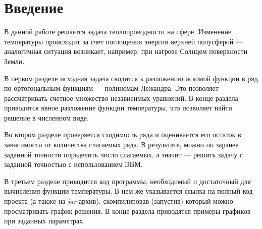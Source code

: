 \section*{Введение}
{}
\label{sec:intro}

В данной работе решается задача теплопроводности на сфере. Изменение температуры происходит за счет поглощения энергии верхней полусферой --- аналогичная ситуация возникает, например, при нагреве Солнцем поверхности Земли.

В первом разделе исходная задача сводится к разложению искомой функции в ряд по ортогональным функциям --- полиномам Лежандра. Это позволяет рассматривать счетное множество независимых уравнений. В конце раздела приводится явное разложение функции температуры, что позволяет найти решение в численном виде. 

Во втором разделе проверяется сходимость ряда и оценивается его остаток в зависимости от количества слагаемых ряда. В результате, можно по заранее заданной точности определить число слагаемых, а значит --- решить задачу с заданной точностью с использованием ЭВМ. 

В третьем разделе приводится код программы, необходимый и достаточный для вычисления функции температуры. В нем же указывается ссылка на полный код проекта (а также на \textit{jar}-архив), скомпилировав (запустив) который можно просматривать график решения. В конце раздела приводятся примеры графиков при заданных параметрах.  
   